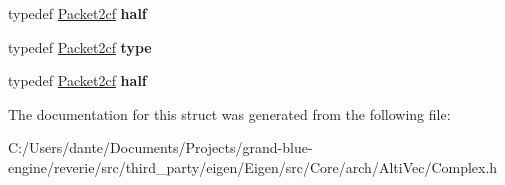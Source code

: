 \begin{DoxyCompactItemize}
typedef \mbox{\hyperlink{struct_eigen_1_1internal_1_1_packet2cf}{Packet2cf}} {\bfseries half}
\item 
\mbox{\label{struct_eigen_1_1internal_1_1packet__traits_3_01std_1_1complex_3_01float_01_4_01_4_a580a3908d84d95ba19d0c9bddcb40f6a}} 
typedef \mbox{\hyperlink{struct_eigen_1_1internal_1_1_packet2cf}{Packet2cf}} {\bfseries type}
\item 
\mbox{\label{struct_eigen_1_1internal_1_1packet__traits_3_01std_1_1complex_3_01float_01_4_01_4_a26ca9289181f825939af56a94afc23db}} 
typedef \mbox{\hyperlink{struct_eigen_1_1internal_1_1_packet2cf}{Packet2cf}} {\bfseries half}
\end{DoxyCompactItemize}


The documentation for this struct was generated from the following file\+:\begin{DoxyCompactItemize}
\item 
C\+:/\+Users/dante/\+Documents/\+Projects/grand-\/blue-\/engine/reverie/src/third\+\_\+party/eigen/\+Eigen/src/\+Core/arch/\+Alti\+Vec/Complex.\+h\end{DoxyCompactItemize}
